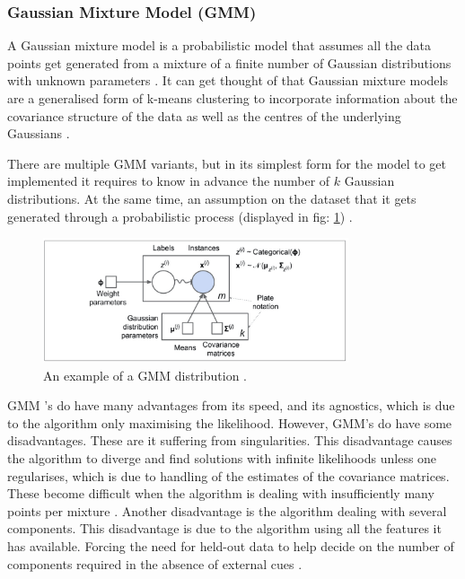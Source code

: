 	\subsubsection{Gaussian Mixture Model (GMM)}
	
	A Gaussian mixture model is a probabilistic model that assumes all the data points get generated from a mixture of a finite number of Gaussian distributions with unknown parameters \cite{geron2019hands, sklearn_gmm}. It can get thought of that Gaussian mixture models are a generalised form of k-means clustering to incorporate information about the covariance structure of the data as well as the centres of the underlying Gaussians \cite{sklearn_gmm}. 
	
	There are multiple GMM variants, but in its simplest form for the model to get implemented it requires to know in advance the number of $k$ Gaussian distributions. At the same time, an assumption on the dataset that it gets generated through a probabilistic process (displayed in fig: \ref{fig:gmm_example}) \cite{geron2019hands}. 
	
	\begin{figure}[t]
		\begin{center}
			\includegraphics[width=9cm]{graphics/gmm_example.jpeg}
			\caption{An example of a GMM distribution \cite{geron2019hands}.}
			\label{fig:gmm_example}
		\end{center}
	\end{figure}
	
	GMM 's do have many advantages from its speed, and its agnostics, which is due to the algorithm only maximising the likelihood. However, GMM's do have some disadvantages. These are it suffering from singularities. This disadvantage causes the algorithm to diverge and find solutions with infinite likelihoods unless one regularises, which is due to handling of the estimates of the covariance matrices. These become difficult when the algorithm is dealing with insufficiently many points per mixture \cite{sklearn_gmm}. Another disadvantage is the algorithm dealing with several components. This disadvantage is due to the algorithm using all the features it has available. Forcing the need for held-out data to help decide on the number of components required in the absence of external cues \cite{sklearn_gmm}.
	

